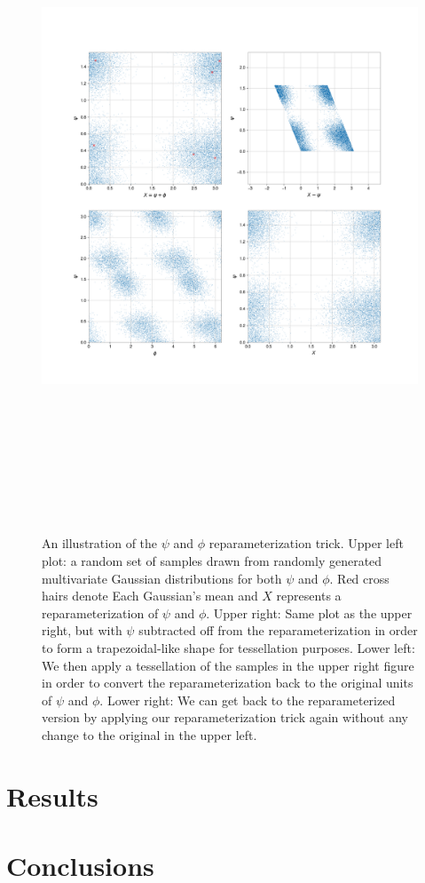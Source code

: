 \begin{figure}
    \centering
    \includegraphics[width=16cm,height=20cm,keepaspectratio]{figures/Xpsi.png}
    \caption{An illustration of the $\psi$ and $\phi$ reparameterization trick. Upper left 
    plot: a random set of samples drawn from randomly generated multivariate Gaussian distributions for both $\psi$ and $\phi$. Red cross hairs denote Each Gaussian's mean and $X$ represents a reparameterization of $\psi$ and $\phi$. Upper right: Same plot as the upper right, but with $\psi$ subtracted off from the reparameterization in 
    order to form a trapezoidal-like shape for tessellation purposes. Lower left: We then apply a tessellation of the samples in the upper right figure in order to convert the reparameterization back to the original units of $\psi$ and $\phi$. Lower right: We can get back to the reparameterized version by applying our reparameterization trick again without any change to the original in the upper left.}
    \label{fig:Xpsi}
\end{figure}

\section{Results}

\section{Conclusions}

